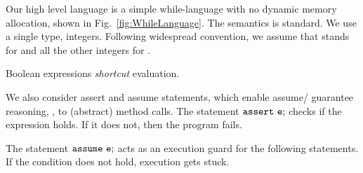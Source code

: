 \documentclass{llncs}
\newcommand{\comment}[1]{}
\begin{document}
Our high level language is a simple while-language with no dynamic
memory allocation, shown in Fig.~\ref{fig:WhileLanguage}.  The
semantics is standard.  We use
a single type, integers.  Following widespread convention, we
assume that  stands for  and all the other
integers for .  
\comment{
So, for instance:
\[
\begin{array}{ll}
& \sem{ \If(0)~ \Stm_1~ \Else~ \Stm_2;  } = \sem{\Stm_2} \\
\text{ and } & \sem{ \If(2 \leq 12 )~ \Stm_1~ \Else~ \Stm_2;  } =  \sem{ \If(1)~ \Stm_1~ \Else~ \Stm_2; } = \sem{\Stm_1}.
\end{array}
\]
}
Boolean expressions \emph{shortcut} evaluation.
\comment{
\[
\begin{array}{ll}
  & \sem{0~ \&\& 1/0} = 0 \text{ and }  \sem{37 \parallel 1/0} = 1 \\
\text{ but } & \sem{1/0~ \&\& 0} =  \sem{1/0 \parallel 37} = \textit{"error: division by zero"}. 
\end{array} 
\]
}
We also consider assert and assume statements, which enable assume/
guarantee reasoning, \eg, to (abstract) method calls.  The
statement $\mathtt{assert}~ \mathtt{e};$ checks if the expression 
holds. If it does not, then the program fails.
\comment{
\[
\sem{\code{x} := 0; \Assert 0 < \code{x}; \code{y} := 1/\code{x}} = \textit{"error: assertion violated"}.
\]
}
The statement $\mathtt{assume}~ \mathtt{e};$ acts as an execution guard for the
following statements. If the condition does not hold, execution gets stuck. 
\comment{
For instance in the code snippet below, the assumption acts as
a guard to the division, so that if $0 \geq \code{x}$, then the
program simply stops.
\[
\sem{\code{x} := 0; \Assume 0 < \code{x}; \code{y} := 1/\code{x}} = \textit{"stop: assumption not satisfied"}.  
\]
}
\end{document}
